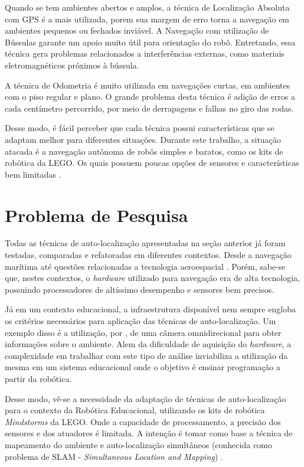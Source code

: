 	Quando se tem ambientes abertos e amplos, a técnica de Localização Absoluta com GPS é a mais utilizada, porem sua margem de erro torna a navegação em ambientes pequenos ou fechados inviável. A Navegação com utilização de Bússulas garante um apoio muito útil para orientação do robô. Entretando, essa técnica gera problemas relacionados a interferências externas, como materiais eletromagnéticos próximos à bússula.
	
	A técnica de Odometria é muito utilizada em navegações curtas, em ambientes com o piso regular e plano. O grande problema desta técnica é adição de erros a cada centímetro percorrido, por meio de derrapagens e falhas no giro das rodas. 

	Desse modo, é fácil perceber que cada técnica possui características que se adaptam melhor para diferentes situações. Durante este trabalho, a situação atacada é a navegação autônoma de robôs simples e baratos, como os kits de robótica da LEGO. Os quais possuem poucas opções de sensores e características bem limitadas \cite{drawLegoRobot}.

\section{Problema de Pesquisa}

	Todas as técnicas de auto-localização apresentadas na seção anterior já foram testadas, comparadas e refatoradas em diferentes contextos. Desde a navegação marítima até questões relacionadas a tecnologia aeroespacial \cite{localizacaoEMapeamentoPaulo}. Porém, sabe-se que, nestes contextos, o \textit{hardware} utilizado para navegação era de alta tecnologia, possuindo processadores de altíssimo desempenho e sensores bem precisos.

	Já em um contexto educacional, a infraestrutura disponível nem sempre engloba os critérios necessários para aplicação das técnicas de auto-localização. Um exemplo disso é a utilização, por \cite{localizacaoEMapeamentoPaulo}, de uma câmera omnidirecional para obter informações sobre o ambiente. Alem da dificuldade de aquisição do \textit{hardware}, a complexidade em trabalhar com este tipo de análise inviabiliza a utilização da mesma em um sistema educacional onde o objetivo é ensinar programação a partir da robótica.

	Desse modo, vê-se a necessidade da adaptação de técnicas de auto-localização para o contexto da Robótica Educacional, utilizando os kits de robótica \textit{Mindstorms} da LEGO. Onde a capacidade de processamento, a precisão dos sensores e dos atuadores é limitada. A intenção é tomar como base a técnica de mapeamento do ambiente e auto-localização simultâneos (conhecida como problema de SLAM - \textit{Simultaneous Location and Mapping}) \cite{slamProblem}.

